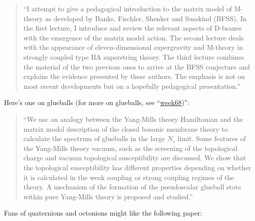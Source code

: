 \documentclass{article}
\def\tightlist{}
\renewcommand{\texttt}[1]{%
  \begingroup
  \ttfamily
  \begingroup\lccode`~=`/\lowercase{\endgroup\def~}{/\discretionary{}{}{}}%
  \begingroup\lccode`~=`[\lowercase{\endgroup\def~}{[\discretionary{}{}{}}%
  \begingroup\lccode`~=`.\lowercase{\endgroup\def~}{.\discretionary{}{}{}}%
  \catcode`/=\active\catcode`[=\active\catcode`.=\active
  \scantokens{#1\noexpand}%
  \endgroup
}
\begin{document}
\begin{quote}
``I attempt to give a pedagogical introduction to the matrix model of
M-theory as developed by Banks, Fischler, Shenker and Susskind (BFSS).
In the first lecture, I introduce and review the relevant aspects of
D-branes with the emergence of the matrix model action. The second
lecture deals with the appearance of eleven-dimensional supergravity and
M-theory in strongly coupled type IIA superstring theory. The third
lecture combines the material of the two previous ones to arrive at the
BFSS conjecture and explains the evidence presented by these authors.
The emphasis is not on most recent developments but on a hopefully
pedagogical presentation.''
\end{quote}

Here's one on glueballs (for more on glueballs, see
``\href{week68.html}{week68})'':


\begin{quote}
``We use an analogy between the Yang-Mills theory Hamiltonian and the
matrix model description of the closed bosonic membrane theory to
calculate the spectrum of glueballs in the large \(N_c\) limit. Some
features of the Yang-Mills theory vacuum, such as the screening of the
topological charge and vacuum topological susceptibility are discussed.
We show that the topological susceptibility has different properties
depending on whether it is calculated in the weak coupling or strong
coupling regimes of the theory. A mechanism of the formation of the
pseudoscalar glueball state within pure Yang-Mills theory is proposed
and studied.''
\end{quote}

Fans of quaternions and octonions might like the following paper:

\end{document}
